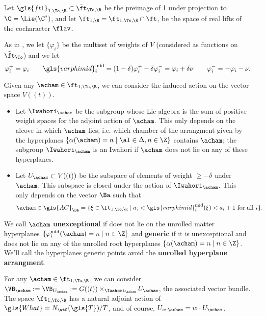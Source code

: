 Let $\gls{ft1}_{1,\To,\R}\subset \tilde{\ft}_{\To,\R}$ be the preimage
of 1 under projection to $\C=\Lie(\C^*)$, and let $\ft_{1,\R}=\ft_{1,
  \To,\R}\cap\tilde{\ft}$, be the space of real
lifts of the cocharacter $\flav$.

As in \cite{WebSD}, we let
$\{\varphi_i\}$ be the multiset of weights of $V$ (considered as
functions on $\tilde{\ft}_{\To}$)  and we let \[\varphi_i^+=\varphi_i\qquad
\gls{varphimid}^{\operatorname{mid}}_i= (1-\delta) \varphi_i^+-\delta\varphi_i^-=\varphi_i+\delta\nu\qquad \varphi_i^-=-\varphi_i-\nu.\]  

Given any $\acham\in \ft_{1,
  \To,\R}$, we can consider the induced action on the
vector space $V((t))$.  
\begin{itemize}
\item Let $\Iwahori_\acham$ be the subgroup whose Lie algebra is the sum of positive weight
spaces for the adjoint action of $\acham$. This only depends on the
alcove in which $\acham$ lies, i.e. which chamber of the arrangment
given by the hyperplanes $\{\alpha(\acham)=n\mid \al\in \Delta, n\in \Z\}$ contains
$\acham$; the subgroup $\Iwahori_\acham$ is an Iwahori if $\acham$ does not
lie on any of these hyperplanes. 
\item Let  $U_\acham\subset V((t))$ be the subspace of elements of 
weight $\geq -\delta$ under $\acham$.  This subspace is closed under the action of
$\Iwahori_\acham$.  This only depends on the vector $\Ba$ such that
\begin{equation}
\acham\in \gls{AC}_{\Ba}=\{\xi \in \ft_{1,
  \To,\R}\mid a_i<\gls{varphimid}_i^{\operatorname{mid}}(\xi)<a_i+1\text{
  for all $i$}\}.\label{eq:aff-cham}
\end{equation}
\end{itemize}

We call $\acham$ {\bf unexceptional} if does not lie on the unrolled matter hyperplanes
$\{\varphi_i^{\operatorname{mid}}(\acham)=n\mid n\in
\Z\}$ and {\bf generic} if it is unexceptional and does not lie on any
of the unrolled root hyperplanes $\{\alpha(\acham)=n\mid
n\in\Z\}$. We'll call the hyperplanes generic points avoid the {\bf
  unrolled hyperplane arrangment}.  

For any $\acham\in  \ft_{1,
  \To,\R}$, we can
consider
$\VB_{\acham}:=\VB_{U_\acham}:=G((t))\times_{\Iwahori_{\acham}}U_{\acham}$,
the associated vector bundle.  
The space $ \ft_{1,
  \To,\R}$ has a natural adjoint action of
$\gls{What}=N_{\wtG}(\gls{T})/T$, and of course,
$U_{w\cdot \acham}=w\cdot U_{\acham}$.  


